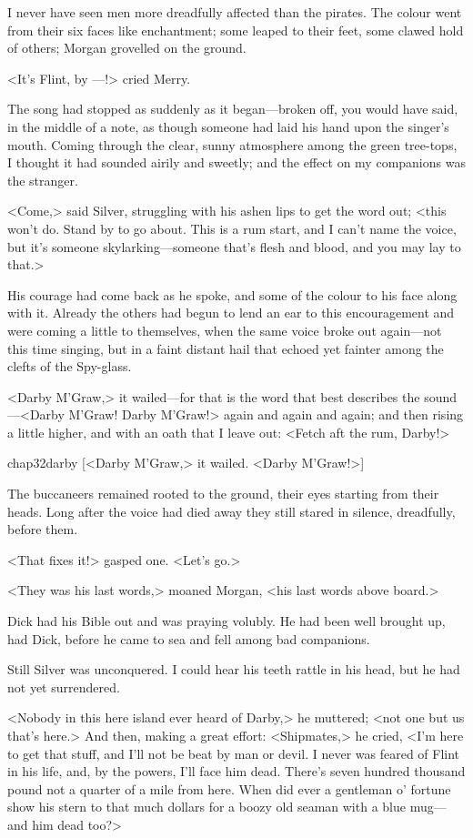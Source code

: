 I never have seen men more dreadfully affected than the pirates. The colour went from their six faces like enchantment; some leaped to their feet, some clawed hold of others; Morgan grovelled on the ground.

<It's Flint, by —!> cried Merry.

The song had stopped as suddenly as it began—broken off, you would have said, in the middle of a note, as though someone had laid his hand upon the singer's mouth. Coming through the clear, sunny atmosphere among the green tree-tops, I thought it had sounded airily and sweetly; and the effect on my companions was the stranger.

<Come,> said Silver, struggling with his ashen lips to get the word out; <this won't do. Stand by to go about. This is a rum start, and I can't name the voice, but it's someone skylarking—someone that's flesh and blood, and you may lay to that.>

His courage had come back as he spoke, and some of the colour to his face along with it. Already the others had begun to lend an ear to this encouragement and were coming a little to themselves, when the same voice broke out again—not this time singing, but in a faint distant hail that echoed yet fainter among the clefts of the Spy-glass.

<Darby M'Graw,> it wailed—for that is the word that best describes the sound—<Darby M'Graw! Darby M'Graw!> again and again and again; and then rising a little higher, and with an oath that I leave out: <Fetch aft the rum, Darby!>


\begin{bwbigpic}
	[\basicscale]
	{chap32darby}
	[<Darby M'Graw,> it wailed. <Darby M'Graw!>]
\end{bwbigpic}

The buccaneers remained rooted to the ground, their eyes starting from their heads. Long after the voice had died away they still stared in silence, dreadfully, before them.

<That fixes it!> gasped one. <Let's go.>

<They was his last words,> moaned Morgan, <his last words above board.>

Dick had his Bible out and was praying volubly. He had been well brought up, had Dick, before he came to sea and fell among bad companions.

Still Silver was unconquered. I could hear his teeth rattle in his head, but he had not yet surrendered.

<Nobody in this here island ever heard of Darby,> he muttered; <not one but us that's here.> And then, making a great effort: <Shipmates,> he cried, <I'm here to get that stuff, and I'll not be beat by man or devil. I never was feared of Flint in his life, and, by the powers, I'll face him dead. There's seven hundred thousand pound not a quarter of a mile from here. When did ever a gentleman o' fortune show his stern to that much dollars for a boozy old seaman with a blue mug—and him dead too?>

